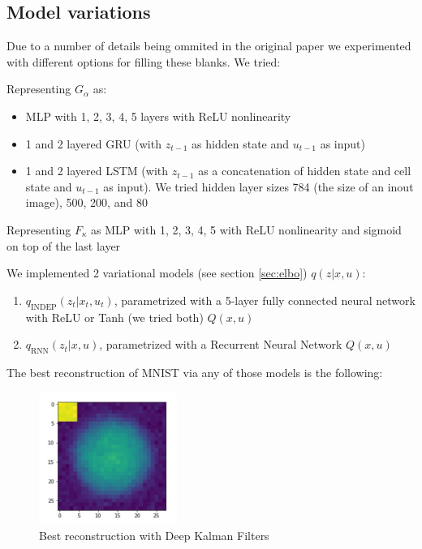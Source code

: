 \documentclass{article}
\begin{document}
\subsection{Model variations}

Due to a number of details being ommited in the original paper we experimented with different options for filling these blanks. We tried:

Representing $ G_{\alpha} $ as:

\begin{itemize}
\item MLP with 1, 2, 3, 4, 5 layers with ReLU nonlinearity
\item 1 and 2 layered GRU (with $ z_{t-1} $ as hidden state and $ u_{t-1} $ as input) 
\item 1 and 2 layered LSTM (with $ z_{t-1} $ as a concatenation of hidden state and cell state and $ u_{t-1} $ as input). We tried hidden layer sizes 784 (the size of an inout image), 500, 200, and 80
\end{itemize}

Representing $ F_{\kappa} $ as MLP with 1, 2, 3, 4, 5 with ReLU nonlinearity and sigmoid on top of the last layer

We implemented 2 variational models (see section \ref{sec:elbo}) $q(z|x,u)$: 
\begin{enumerate}
    \item $ q_{\text{INDEP}} (z_t|x_t,u_t)$, parametrized with a 5-layer fully connected neural network with ReLU or Tanh (we tried both) $Q(x,u)$
    \item $ q_{\text{RNN}}(z_t|x, u) $, parametrized with a Recurrent Neural Network $Q(x,u)$
\end{enumerate}

The best reconstruction of MNIST via any of those models is the following:

\begin{figure}[h]
\centering
\includegraphics[width=0.4\textwidth]{best_reconstr.jpg}
\caption{Best reconstruction with Deep Kalman Filters}
\label{fig:rec}
\end{figure}
\end{document}
